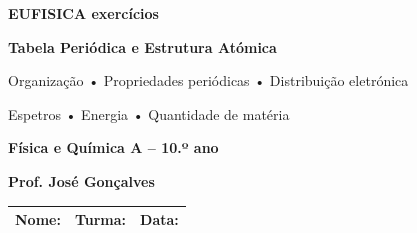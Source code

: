 \documentclass[11pt,a4paper]{article}
\begin{document}
	
	
	\begin{tcolorbox}[
		enhanced,
		colback=eudark,
		colframe=eudark,
		arc=3mm,
		boxrule=0pt,
		left=5mm,
		right=5mm,
		top=5mm,
		bottom=5mm
		]
		
		\begin{center}
			
			{\Huge\bfseries\color{white}
				EUFISICA exercícios}
			
			\vspace{2mm}
			
			{\Large\bfseries\color{white}
				Tabela Periódica e Estrutura Atómica}
			
			\vspace{2mm}
			
			{\large\color{eulightblue}
				Organização • Propriedades periódicas • Distribuição eletrónica}
			
			{\large\color{eulightblue}
				Espetros • Energia • Quantidade de matéria}
			
			\vspace{3mm}
			
			{\large\color{white}
				\textbf{Física e Química A -- 10.º ano}}
			
			\vspace{2mm}
			
			{\color{white}
				\textbf{Prof. José Gonçalves}}
			
		\end{center}
		
	\end{tcolorbox}
	
	\vspace{3mm}
	
	\begin{tabularx}{\textwidth}{|X|X|X|}
		\hline
		\textbf{Nome:}
		&
		\textbf{Turma:}
		&
		\textbf{Data:}
		\\[6mm]
		\hline
	\end{tabularx}
	
	\vspace{5mm}
	
	
\end{document}
